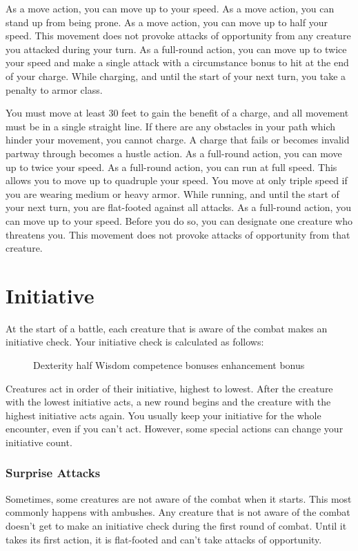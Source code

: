  As a move action, you can move up to your speed.
 As a move action, you can stand up from being prone.
 As a move action, you can move up to half your speed. This movement does not provoke attacks of opportunity from any creature you attacked during your turn.
 As a full-round action, you can move up to twice your speed and make a single attack with a  circumstance bonus to hit at the end of your charge. While charging, and until the start of your next turn, you take a  penalty to armor class.
\par You must move at least 30 feet to gain the benefit of a charge, and all movement must be in a single straight line. If there are any obstacles in your path which hinder your movement, you cannot charge. A charge that fails or becomes invalid partway through becomes a hustle action.
 As a full-round action, you can move up to twice your speed.
 As a full-round action, you can run at full speed. This allows you to move up to quadruple your speed. You move at only triple speed if you are wearing medium or heavy armor. While running, and until the start of your next turn, you are flat-footed against all attacks. 
 As a full-round action, you can move up to your speed. Before you do so, you can designate one creature who threatens you. This movement does not provoke attacks of opportunity from that creature.

\section{Initiative}

At the start of a battle, each creature that is aware of the combat makes an initiative check. Your initiative check is calculated as follows:

\begin{figure}[h]
    \centering Dexterity \add half Wisdom \add competence bonuses \add enhancement bonus
\end{figure}

Creatures act in order of their initiative, highest to lowest. After the creature with the lowest initiative acts, a new round begins and the creature with the highest initiative acts again. You usually keep your initiative for the whole encounter, even if you can't act. However, some special actions can change your initiative count.

\subsubsection{Surprise Attacks}
Sometimes, some creatures are not aware of the combat when it starts. This most commonly happens with ambushes. Any creature that is not aware of the combat doesn't get to make an initiative check during the first round of combat. Until it takes its first action, it is flat-footed and can't take attacks of opportunity.

